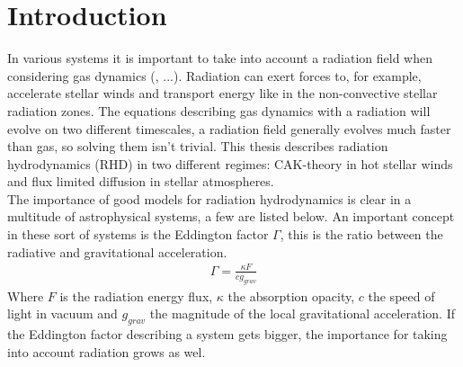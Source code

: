 \chapter{Introduction}


In various systems it is important to take into account a radiation field when considering gas dynamics (\cite{Tetsu2016},  ...). Radiation can exert forces to, for example, accelerate stellar winds and transport energy like in the non-convective stellar radiation zones. The equations describing gas dynamics with a radiation will evolve on two different timescales, a radiation field generally evolves much faster than gas, so solving them isn't trivial. This thesis describes radiation hydrodynamics (RHD) in two different regimes: CAK-theory in hot stellar winds and flux limited diffusion in stellar atmospheres.\\

The importance of good models for radiation hydrodynamics is clear in a multitude of astrophysical systems, a few are listed below. An important concept in these sort of systems is the Eddington factor $\Gamma$, this is the ratio between the radiative and gravitational acceleration.
\begin{align}
	\Gamma = \frac{\kappa F}{c g_{grav}}
\end{align}
Where $F$ is the radiation energy flux, $\kappa$ the absorption opacity, $c$ the speed of light in vacuum and $g_{grav}$ the magnitude of the local gravitational acceleration. If the Eddington factor describing a system gets bigger, the importance for taking into account radiation grows as wel.

